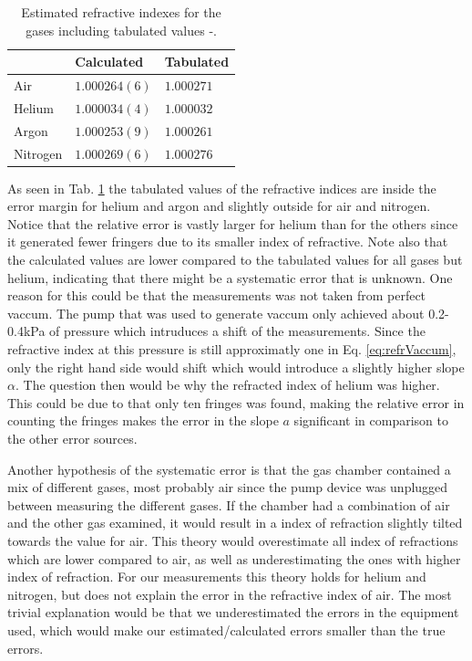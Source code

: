 \begin{table}[H]
  \centering
  \caption{Estimated refractive indexes for the gases including tabulated values \cite{idxAir}-\cite{idxNit}.}
  \label{tab:refrIndex}
  \begin{tabular}{l|l|l}%
          & Calculated & Tabulated  \\ \hline %
    Air      & $1.000264(6)$  & $1.000271$  \\ %
    Helium   & $1.000034(4)$  & $1.000032$  \\ %
    Argon    & $1.000253(9)$  & $1.000261$  \\ %
    Nitrogen & $1.000269(6)$  & $1.000276$  \\ %
  \end{tabular}
\end{table}

As seen in Tab. \ref{tab:refrIndex} the tabulated values of the refractive indices are inside the error margin for helium and argon and slightly outside for air and nitrogen. Notice that the relative error is vastly larger for helium than for the others since it generated fewer fringers due to its smaller index of refractive. Note also that the calculated values are lower compared to the tabulated values for all gases but helium, indicating that there might be a systematic error that is unknown. One reason for this could be that the measurements was not taken from perfect vaccum. The pump that was used to generate vaccum only achieved about 0.2-0.4kPa of pressure which intruduces a shift of the measurements. Since the refractive index at this pressure is still approximatly one in Eq. \ref{eq:refrVaccum}, only the right hand side would shift which would introduce a slightly higher slope $\alpha$. The question then would be why the refracted index of helium was higher. This could be due to that only ten fringes was found, making the relative error in counting the fringes makes the error in the slope $a$ significant in comparison to the other error sources.

Another hypothesis of the systematic error is that the gas chamber contained a mix of different gases, most probably air since the pump device was unplugged between measuring the different gases. If the chamber had a combination of air and the other gas examined, it would result in a index of refraction slightly tilted towards the value for air. This theory would overestimate all index of refractions which are lower compared to air, as well as underestimating the ones with higher index of refraction. For our measurements this theory holds for helium and nitrogen, but does not explain the error in the refractive index of air. The most trivial explanation would be that we underestimated the errors in the equipment used, which would make our estimated/calculated errors smaller than the true errors.


